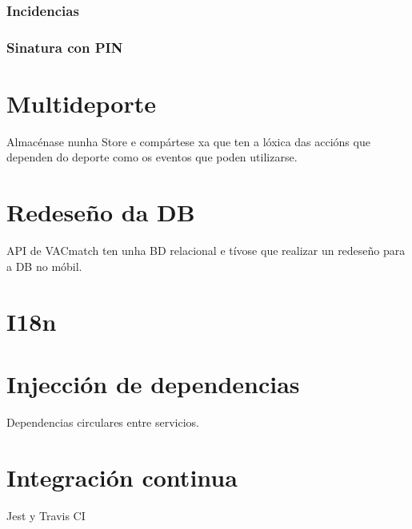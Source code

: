       \subsubsection{Incidencias}

      \subsubsection{Sinatura con PIN}

  \section{Multideporte}
  Almacénase nunha Store e compártese xa que ten a lóxica das accións que dependen do 
  deporte como os eventos que poden utilizarse.

  \section{Redeseño da DB}
  API de VACmatch ten unha BD relacional e tívose que realizar un redeseño para a DB no 
móbil.

  \section{I18n}

  \section{Injección de dependencias}
  Dependencias circulares entre servicios.

  \section{Integración continua}
  Jest y Travis CI

